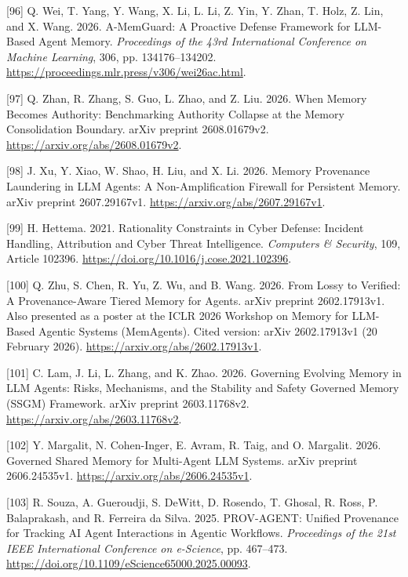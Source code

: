 \documentclass[
  11pt,
]{article}
\newlength{\cslhangindent}
\newlength{\cslentryspacingunit} %
\newenvironment{CSLReferences}[2] %
 {%
  \setlength{\parindent}{0pt}
  \ifodd #1
  \let\oldpar\par
  \def\par{\hangindent=\cslhangindent\oldpar}
  \fi
  \setlength{\parskip}{#2\cslentryspacingunit}
 }%
 {}
\begin{document}
\begin{CSLReferences}{1}{1}
\leavevmode{}%
{[}96{]} Q. Wei, T. Yang, Y. Wang, X. Li, L. Li, Z. Yin, Y. Zhan, T.
Holz, Z. Lin, and X. Wang. 2026. A-MemGuard: A Proactive Defense
Framework for LLM-Based Agent Memory. \emph{Proceedings of the 43rd
International Conference on Machine Learning}, 306, pp. 134176--134202.
\url{https://proceedings.mlr.press/v306/wei26ac.html}.

\leavevmode{}%
{[}97{]} Q. Zhan, R. Zhang, S. Guo, L. Zhao, and Z. Liu. 2026. When
Memory Becomes Authority: Benchmarking Authority Collapse at the Memory
Consolidation Boundary. arXiv preprint 2608.01679v2.
\url{https://arxiv.org/abs/2608.01679v2}.

\leavevmode{}%
{[}98{]} J. Xu, Y. Xiao, W. Shao, H. Liu, and X. Li. 2026. Memory
Provenance Laundering in LLM Agents: A Non-Amplification Firewall for
Persistent Memory. arXiv preprint 2607.29167v1.
\url{https://arxiv.org/abs/2607.29167v1}.

\leavevmode{}%
{[}99{]} H. Hettema. 2021. Rationality Constraints in Cyber Defense:
Incident Handling, Attribution and Cyber Threat Intelligence.
\emph{Computers \& Security}, 109, Article 102396.
\url{https://doi.org/10.1016/j.cose.2021.102396}.

\leavevmode{}%
{[}100{]} Q. Zhu, S. Chen, R. Yu, Z. Wu, and B. Wang. 2026. From Lossy
to Verified: A Provenance-Aware Tiered Memory for Agents. arXiv preprint
2602.17913v1. Also presented as a poster at the ICLR 2026 Workshop on
Memory for LLM-Based Agentic Systems (MemAgents). Cited version: arXiv
2602.17913v1 (20 February 2026).
\url{https://arxiv.org/abs/2602.17913v1}.

\leavevmode{}%
{[}101{]} C. Lam, J. Li, L. Zhang, and K. Zhao. 2026. Governing Evolving
Memory in LLM Agents: Risks, Mechanisms, and the Stability and Safety
Governed Memory (SSGM) Framework. arXiv preprint 2603.11768v2.
\url{https://arxiv.org/abs/2603.11768v2}.

\leavevmode{}%
{[}102{]} Y. Margalit, N. Cohen-Inger, E. Avram, R. Taig, and O.
Margalit. 2026. Governed Shared Memory for Multi-Agent LLM Systems.
arXiv preprint 2606.24535v1. \url{https://arxiv.org/abs/2606.24535v1}.

\leavevmode{}%
{[}103{]} R. Souza, A. Gueroudji, S. DeWitt, D. Rosendo, T. Ghosal, R.
Ross, P. Balaprakash, and R. Ferreira da Silva. 2025. PROV-AGENT:
Unified Provenance for Tracking AI Agent Interactions in Agentic
Workflows. \emph{Proceedings of the 21st IEEE International Conference
on e-Science}, pp. 467--473.
\url{https://doi.org/10.1109/eScience65000.2025.00093}.


\end{CSLReferences}
\end{document}
